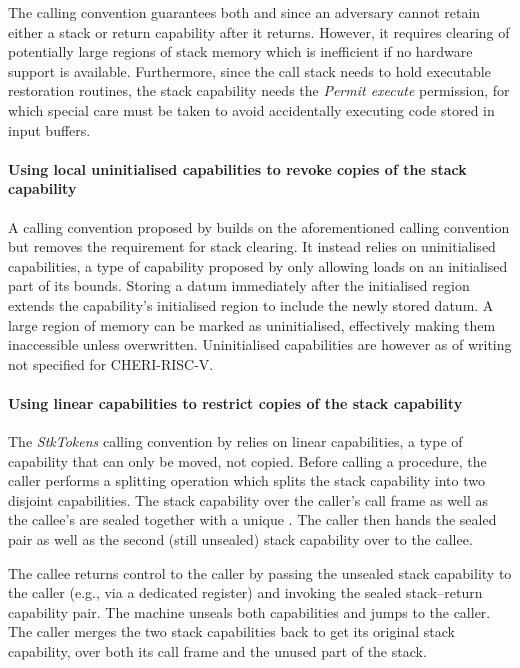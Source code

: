 \documentclass[main.tex]{subfiles}
\begin{document}
The calling convention guarantees both  and  since an adversary cannot retain either a stack or return capability after it returns. However, it requires clearing of potentially large regions of stack memory which is inefficient if no hardware support is available. Furthermore, since the call stack needs to hold executable restoration routines, the stack capability needs the \emph{Permit execute} permission, for which special care must be taken to avoid accidentally executing code stored in input buffers.

\paragraph{Using local uninitialised capabilities to revoke copies of the stack capability} A calling convention proposed by \cite{uninitcapss,uninitcaps} builds on the aforementioned calling convention but removes the requirement for stack clearing. It instead relies on uninitialised capabilities, a type of capability proposed by \cite{uninitcapss} only allowing loads on an initialised part of its bounds. Storing a datum immediately after the initialised region extends the capability's initialised region to include the newly stored datum. A large region of memory can be marked as uninitialised, effectively making them inaccessible unless overwritten. Uninitialised capabilities are however as of writing not specified for CHERI-RISC-V.

\paragraph{Using linear capabilities to restrict copies of the stack capability} The \emph{StkTokens} calling convention by \cite{stktokens} relies on linear capabilities, a type of capability that can only be moved, not copied. Before calling a procedure, the caller performs a splitting operation which splits the stack capability into two disjoint capabilities. The stack capability over the caller's call frame as well as the callee's  are sealed together with a unique . The caller then hands the sealed pair as well as the second (still unsealed) stack capability over to the callee.

The callee returns control to the caller by passing the unsealed stack capability to the caller (e.g., via a dedicated register) and invoking the sealed stack–return capability pair. The machine unseals both capabilities and jumps to the caller. The caller merges the two stack capabilities back to get its original stack capability, over both its call frame and the unused part of the stack.
\end{document}
